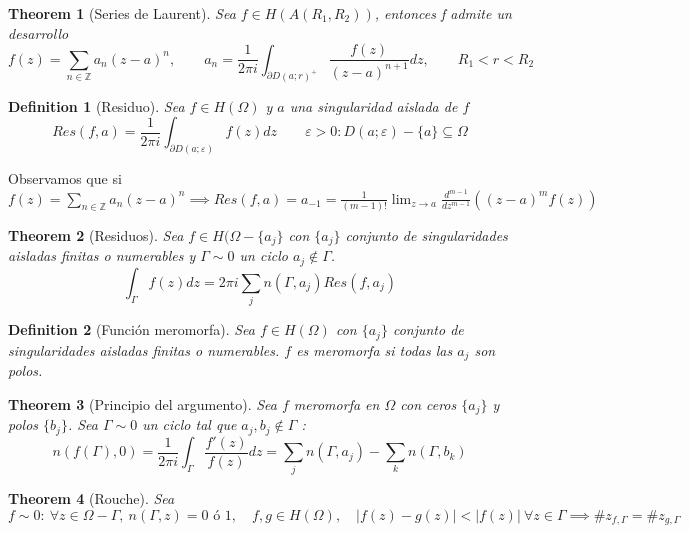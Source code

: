 \documentclass{myclass} \usepackage{verbatim}
\newtheorem*{definition}{Definition}
\newtheorem*{theorem}{Theorem}
\begin{document}
\begin{theorem}[Series de Laurent]
Sea $f\in H(A(R_1, R_2))$, entonces f admite un desarrollo
\[
f(z) = \sum_{n\in \mathbb{Z}} a_n(z-a)^n, \qquad a_n = \frac{1}{2\pi i} \int_{\partial D(a;r)^+} \frac{f(z)}{(z-a)^{n+1}}dz, \qquad R_1<r<R_2
\] 
\end{theorem}

\begin{definition}[Residuo]
Sea $f\in H(\Omega)$ y $a$ una singularidad aislada de $f$ 
\[
Res(f, a) = \frac{1}{2\pi i}\int_{\partial D(a; \varepsilon) } f(z)dz \qquad \varepsilon >0 : D(a;\varepsilon )-\{a\} \subseteq \Omega
\] 
\end{definition}
Observamos que si $\displaystyle  f(z) = \sum_{n\in \mathbb{Z}} a_n(z-a)^n  \implies Res(f, a) = a_{-1} =  \frac{1}{(m-1)!} \lim_{z\to a} \frac{d^{m-1}}{dz^{m-1}}\left((z-a)^mf(z)\right)$ 

\begin{theorem}[Residuos]
Sea $f\in H(\Omega-\{a_j\}$ con $\{a_j\}$ conjunto de singularidades aisladas finitas o numerables y $\Gamma \sim 0$ un ciclo  $a_j\not\in \Gamma$.
\[
\int_\Gamma f(z)dz = 2\pi i \sum_j n(\Gamma, a_j)Res(f, a_j)
\] 
\end{theorem}

\begin{definition}[Función meromorfa]
Sea $f\in H(\Omega)$ con $\{a_j\}$ conjunto de singularidades aisladas finitas o numerables.  $f$ es meromorfa si todas las $a_j$ son polos.
\end{definition}

\begin{theorem}[Principio del argumento]
Sea $f$ meromorfa en $\Omega$ con ceros $\{a_j\}$ y polos  $\{b_j\}$. Sea $\Gamma \sim 0$ un ciclo tal que $a_j, b_j \not \in \Gamma $ :
\[
n(f(\Gamma ), 0) = \frac{1}{2\pi i} \int_\Gamma \frac{f'(z)}{f(z)}dz = \sum_j n(\Gamma , a_j) - \sum_k n(\Gamma , b_k)
\]
\end{theorem}

\begin{theorem}[Rouche]
Sea $f\sim 0: \ \forall z\in \Omega -\Gamma , \ n(\Gamma , z)= 0 \text{ ó } 1, \quad f, g \in H(\Omega ), \quad |f(z)-g(z)|< |f(z)| \ \forall z\in \Gamma  \implies \#z_{f, \Gamma } = \#z_{g, \Gamma }$

\end{theorem}
\end{document}
